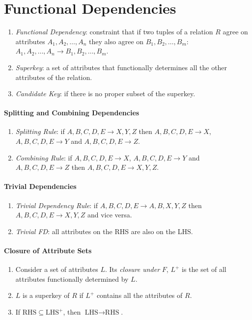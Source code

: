\documentclass[twocolumn,english]{article}
\begin{document}
\section{Functional Dependencies}
\begin{enumerate}
\item \emph{Functional Dependency}: constraint that if two tuples of a relation
$R$ agree on attributes $A_{1},A_{2},\dots,A_{n}$ they also agree
on $B_{1},B_{2},\dots,B_{m}$: $A_{1},A_{2},\dots,A_{n}\rightarrow B_{1},B_{2},\dots,B_{m}$.
\item \emph{Superkey}: a set of attributes that functionally determines
all the other attributes of the relation.
\item \emph{Candidate Key}: if there is no proper subset of the superkey.
\end{enumerate}

\paragraph{Splitting and Combining Dependencies}
\begin{enumerate}
\item \emph{Splitting Rule}: if $A,B,C,D,E\rightarrow X,Y,Z$ then $A,B,C,D,E\rightarrow X$,
$A,B,C,D,E\rightarrow Y$ and $A,B,C,D,E\rightarrow Z$.
\item \emph{Combining Rule}: if $A,B,C,D,E\rightarrow X$, $A,B,C,D,E\rightarrow Y$
and $A,B,C,D,E\rightarrow Z$ then $A,B,C,D,E\rightarrow X,Y,Z$.
\end{enumerate}

\paragraph{Trivial Dependencies}
\begin{enumerate}
\item \emph{Trivial Dependency Rule}: if $A,B,C,D,E\rightarrow A,B,X,Y,Z$
then $A,B,C,D,E\rightarrow X,Y,Z$ and vice versa.
\item \emph{Trivial FD}: all attributes on the RHS are also on the LHS.
\end{enumerate}

\paragraph{Closure of Attribute Sets}
\begin{enumerate}
\item Consider a set of attributes $L$. Its \emph{closure under} $F$,
$L^{+}$ is the set of all attributes functionally determined by $L$.
\item $L$ is a superkey of $R$ if $L^{+}$ contains all the attributes
of $R$.
\item If $\mbox{RHS}\subseteq\mbox{LHS}^{+}$, then $\mbox{LHS}\rightarrow\mbox{RHS}$.
\end{enumerate}
\end{document}
